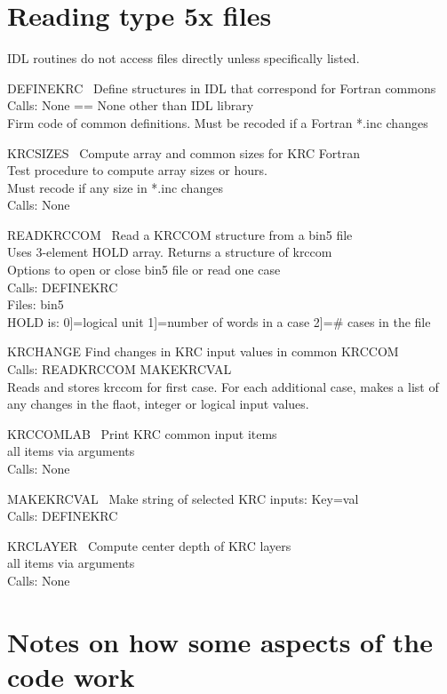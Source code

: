 \documentclass[draft]{article}  %
\begin{document}
\section{Reading type 5x files} %

IDL routines do not access files directly unless specifically listed.

DEFINEKRC \ Define structures in IDL that correspond for Fortran commons \\
Calls: None == None other than IDL library \\
Firm code of common definitions. Must be recoded if a Fortran *.inc changes

KRCSIZES \ Compute array and common sizes for KRC Fortran \\
Test procedure to compute array sizes or hours. \\
Must recode if any size in *.inc changes \\
Calls: None

READKRCCOM \ Read a KRCCOM structure from a bin5 file \\
Uses 3-element HOLD array. Returns a structure of krccom \\
Options to open or close bin5 file or read one case  \\
Calls: DEFINEKRC \\
Files: bin5 \\
HOLD is: 0]=logical unit  1]=number of words in a case  2]=\# cases in the file 

KRCHANGE   Find changes in KRC input values in common KRCCOM \\
Calls:  READKRCCOM  MAKEKRCVAL \\
Reads and stores krccom for first case. For each additional case, makes a 
list of any changes in the flaot, integer or logical input values. 

KRCCOMLAB \ Print KRC common input items \\
 all items via arguments \\
Calls: None

MAKEKRCVAL \ Make string of selected KRC inputs: Key=val \\
Calls: DEFINEKRC

KRCLAYER \ Compute center depth of KRC layers \\
 all items via arguments \\
Calls: None


\section{Notes on how some aspects of the code work} %
\end{document}

